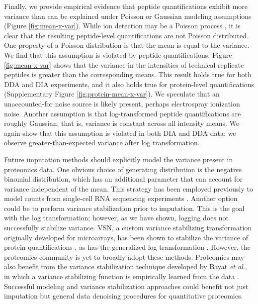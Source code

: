 \documentclass{article}
\begin{document}
Finally, we provide empirical evidence that peptide quantifications exhibit more variance than can be explained under Poisson or Gaussian modeling assumptions (Figure \ref{fig:mean-x-var}). While ion detection may be a Poisson process \cite{ms-dist-derivation, stat-theory-lcms, kimmel-2005}, it is clear that the resulting peptide-level quantifications are not Poisson distributed. One property of a Poisson distribution is that the mean is equal to the variance. We find that this assumption is violated by peptide quantifications: Figure \ref{fig:mean-x-var} shows that the variance in the intensities of technical replicate peptides is greater than the corresponding means. This result holds true for both DDA and DIA experiments, and it also holds true for protein-level quantifications (Supplementary Figure \ref{fig:protein-mean-x-var}). We speculate that an unaccounted-for noise source is likely present, perhaps electrospray ionization noise. Another assumption is that log-transformed peptide quantifications are roughly Gaussian, that is, variance is constant across all intensity means. We again show that this assumption is violated in both DIA and DDA data: we observe greater-than-expected variance after log transformation.

Future imputation methods should explicitly model the variance present in proteomics data. One obvious choice of generating distribution is the negative binomial distribution, which has an additional parameter that can account for variance independent of the mean. This strategy has been employed previously to model counts from single-cell RNA sequencing experiments \cite{ZINB, neg-binom-scRNAseq}. Another option could be to perform variance stabilization prior to imputation. This is the goal with the log transformation; however, as we have shown, logging does not successfully stabilize variance. VSN, a custom variance stabilizing transformation originally developed for microarrays, has been shown to stabilize the variance of protein quantifications \cite{variance-stable-microarray, valikangas}, as has the generalized log transformation \cite{ms-noise-2-component}. However, the proteomics community is yet to broadly adopt these methods. Proteomics may also benefit from the variance stabilization technique developed by Bayat \textit{et al.}, in which a variance stabilizing function is empirically learned from the data \cite{variance-stable}. Successful modeling and variance stabilization approaches could benefit not just imputation but general data denoising procedures for quantitative proteomics.
\end{document}
